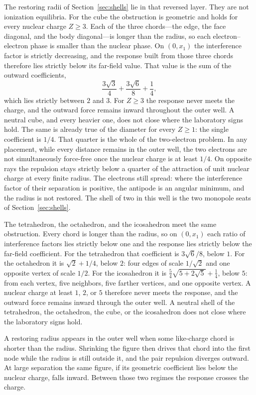 \documentclass[a4paper]{article}
\begin{document}
The restoring radii of Section~\ref{sec:shells} lie in that reversed layer. They are not ionization equilibria. For the cube the obstruction is geometric and holds for every nuclear charge \(Z\ge 3\). Each of the three chords---the edge, the face diagonal, and the body diagonal---is longer than the radius, so each electron--electron phase is smaller than the nuclear phase. On \((0,x_1)\) the interference factor is strictly decreasing, and the response built from those three chords therefore lies strictly below its far-field value. That value is the sum of the outward coefficients,
\[
\frac{3\sqrt{3}}{4}+\frac{3\sqrt{6}}{8}+\frac14,
\]
which lies strictly between \(2\) and \(3\). For \(Z\ge 3\) the response never meets the charge, and the outward force remains inward throughout the outer well. A neutral cube, and every heavier one, does not close where the laboratory signs hold. The same is already true of the diameter for every \(Z\ge 1\): the single coefficient is \(1/4\). That quarter is the whole of the two-electron problem. In any placement, while every distance remains in the outer well, the two electrons are not simultaneously force-free once the nuclear charge is at least \(1/4\). On opposite rays the repulsion stays strictly below a quarter of the attraction of unit nuclear charge at every finite radius. The electrons still spread: where the interference factor of their separation is positive, the antipode is an angular minimum, and the radius is not restored. The shell of two in this well is the two monopole seats of Section~\ref{sec:shells}.

The tetrahedron, the octahedron, and the icosahedron meet the same obstruction. Every chord is longer than the radius, so on \((0,x_1)\) each ratio of interference factors lies strictly below one and the response lies strictly below the far-field coefficient. For the tetrahedron that coefficient is \(3\sqrt{6}/8\), below \(1\). For the octahedron it is \(\sqrt{2}+1/4\), below \(2\): four edges of scale \(1/\sqrt{2}\) and one opposite vertex of scale \(1/2\). For the icosahedron it is \(\frac54\sqrt{5+2\sqrt{5}}+\frac14\), below \(5\): from each vertex, five neighbors, five farther vertices, and one opposite vertex. A nuclear charge at least \(1\), \(2\), or \(5\) therefore never meets the response, and the outward force remains inward through the outer well. A neutral shell of the tetrahedron, the octahedron, the cube, or the icosahedron does not close where the laboratory signs hold.

A restoring radius appears in the outer well when some like-charge chord is shorter than the radius. Shrinking the figure then drives that chord into the first node while the radius is still outside it, and the pair repulsion diverges outward. At large separation the same figure, if its geometric coefficient lies below the nuclear charge, falls inward. Between those two regimes the response crosses the charge.
\end{document}
